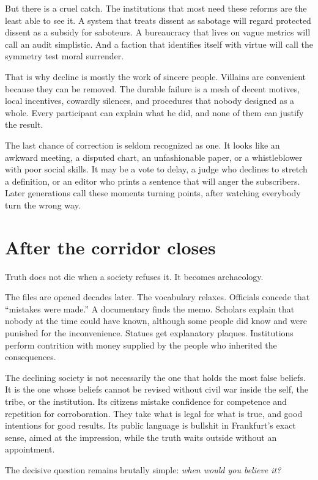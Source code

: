\documentclass[12pt,a4paper]{book}
\begin{document}
But there is a cruel catch. The institutions that most need these reforms are the least able to see it. A system that treats dissent as sabotage will regard protected dissent as a subsidy for saboteurs. A bureaucracy that lives on vague metrics will call an audit simplistic. And a faction that identifies itself with virtue will call the symmetry test moral surrender.

That is why decline is mostly the work of sincere people. Villains are convenient because they can be removed. The durable failure is a mesh of decent motives, local incentives, cowardly silences, and procedures that nobody designed as a whole. Every participant can explain what he did, and none of them can justify the result.

The last chance of correction is seldom recognized as one. It looks like an awkward meeting, a disputed chart, an unfashionable paper, or a whistleblower with poor social skills. It may be a vote to delay, a judge who declines to stretch a definition, or an editor who prints a sentence that will anger the subscribers. Later generations call these moments turning points, after watching everybody turn the wrong way.

\section{After the corridor closes}

Truth does not die when a society refuses it. It becomes archaeology.

The files are opened decades later. The vocabulary relaxes. Officials concede that ``mistakes were made.'' A documentary finds the memo. Scholars explain that nobody at the time could have known, although some people did know and were punished for the inconvenience. Statues get explanatory plaques. Institutions perform contrition with money supplied by the people who inherited the consequences.

The declining society is not necessarily the one that holds the most false beliefs. It is the one whose beliefs cannot be revised without civil war inside the self, the tribe, or the institution. Its citizens mistake confidence for competence and repetition for corroboration. They take what is legal for what is true, and good intentions for good results. Its public language is bullshit in Frankfurt's exact sense, aimed at the impression, while the truth waits outside without an appointment.

The decisive question remains brutally simple: \emph{when would you believe it?}
\end{document}
